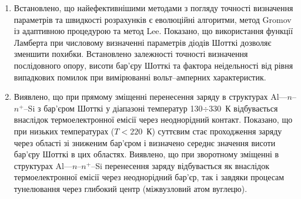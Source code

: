 \begin{enumerate}[leftmargin=0cm,itemindent=3em]
   \item Встановлено, що найефективнішими методами з погляду точності визначення параметрів та швидкості розрахунків є еволюційні алгоритми, метод Gromov із адаптивною процедурою та метод Lee.
    Показано, що використання функції Ламберта при числовому визначенні параметрів діодів Шотткі дозволяє зменшити похибки.
    Встановлено залежності точності визначення послідовного опору, висоти бар'єру Шотткі та фактора неідельності від %
    рівня випадкових помилок при вимірюванні вольт--амперних характеристик.

   \item
Виявлено, що при прямому зміщенні перенесення заряду в структурах Al---$n$--$n^+$--Si з бар'єром Шотткі у діапазоні температур 130$\div$330~К відбувається внаслідок термоелектронної емісії через неоднорідний контакт.
        Показано, що при низьких температурах ($T<220$~К) суттєвим стає проходження заряду через області зі зниженим бар'єром і визначено середнє значення висоти бар'єру Шотткі в цих областях.
     Виявлено, що при зворотному зміщенні в структурах Al---$n$--$n^+$--Si перенесення заряду відбувається як внаслідок термоелектронної емісії через неоднорідний бар'єр, так і завдяки процесам тунелювання через глибокий центр (міжвузловий атом вуглецю).


\end{enumerate}
